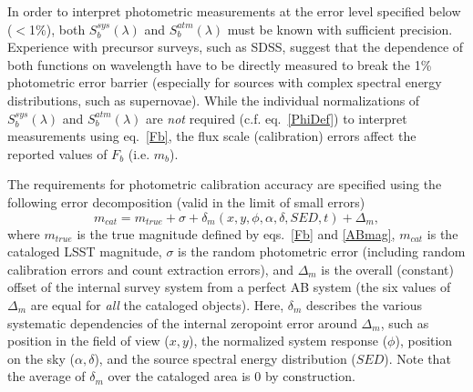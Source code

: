 In order to interpret photometric measurements at the error level
specified below ($<$1\%), both $S_b^{sys}(\lambda)$ and $S_b^{atm}(\lambda)$
must be known with sufficient precision. Experience with precursor surveys,
such as SDSS, suggest that the dependence of both functions on
wavelength have to be directly measured to break the 1\% photometric error
barrier (especially for sources with complex spectral energy distributions,
such as supernovae). While the individual normalizations of $S_b^{sys}(\lambda)$ and
$S_b^{atm}(\lambda)$ are {\it not} required (c.f. eq.~\ref{PhiDef}) to
interpret measurements using eq.~\ref{Fb}, the flux scale (calibration)
errors affect the reported values of $F_b$ (i.e. $m_b$).  




The requirements for photometric calibration accuracy are specified using
the following error decomposition (valid in the limit of small errors)
\begin{equation}
\label{photoSysErr}
 m_{cat} = m_{true} + \sigma + \delta_m(x,y,\phi,\alpha,\delta,SED,t) + \Delta_m,
\end{equation}
where $m_{true}$ is the true magnitude defined by eqs.~\ref{Fb} and
\ref{ABmag}, $m_{cat}$ is the cataloged LSST magnitude, $\sigma$ is the random
photometric error (including random calibration errors and count extraction
errors), and $\Delta_m$ is the overall (constant) offset of the
internal survey system from a perfect AB system (the six values of $\Delta_m$
are equal for {\it all} the cataloged objects). Here, $\delta_m$ describes
the various systematic dependencies of the internal zeropoint error around
$\Delta_m$, such as position in the field of view ($x,y$), the normalized
system response ($\phi$), position on the sky ($\alpha, \delta$), and
the source spectral energy distribution ($SED$). Note that the average of
$\delta_m$ over the cataloged area is 0 by construction.

